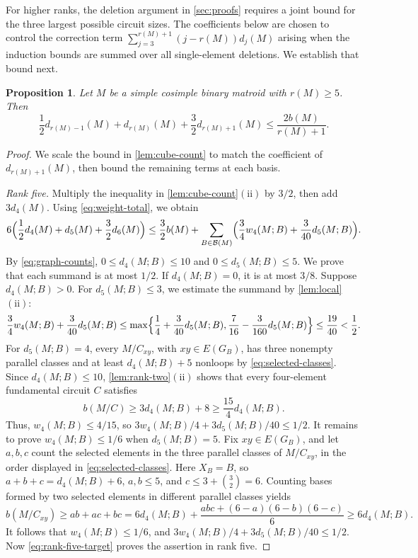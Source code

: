\documentclass[10pt,a4paper]{article}
\numberwithin{equation}{section}
\newtheorem{proposition}[proposition]{Proposition}
\newcommand{\BB}{\mathcal B}
\newcommand{\wloc}[1]{w_{#1}(M;B)}
\newcommand{\dloc}[1]{d_{#1}(M;B)}
\begin{document}
For higher ranks, the deletion argument in \autoref{sec:proofs}
requires a joint bound for the three largest possible circuit sizes.
The coefficients below are chosen to control the correction term
\(\sum_{j=3}^{r(M)+1}(j-r(M))d_j(M)\) arising when the induction
bounds are summed over all single-element deletions.
We establish that bound next.
\begin{proposition}\label{prop:joint}
Let \(M\) be a simple cosimple binary matroid with \(r(M)\ge5\). Then
\[
 \frac12d_{r(M)-1}(M)+d_{r(M)}(M)+\frac32d_{r(M)+1}(M)
 \le\frac{2b(M)}{r(M)+1}.
\]
\end{proposition}
\begin{proof}
We scale the bound in \autoref{lem:cube-count} to match the coefficient of
\(d_{r(M)+1}(M)\), then bound the remaining terms at each basis.

\emph{Rank five.}
Multiply the inequality in \autoref{lem:cube-count}\(\mathrm{(ii)}\)
by \(3/2\), then add \(3d_4(M)\). Using \eqref{eq:weight-total}, we obtain
\begin{equation}
 6\Bigl(\frac12d_4(M)+d_5(M)+\frac32d_6(M)\Bigr)\le\frac32b(M)+\sum_{B\in\BB(M)}
 \Bigl(\frac34\wloc4+\frac3{40}\dloc5\Bigr).
 \label{eq:rank-five-target}
\end{equation}
By \eqref{eq:graph-counts}, \(0\le\dloc4\le10\) and \(0\le\dloc5\le5\).
We prove that each summand is at most \(1/2\).
If \(\dloc4=0\), it is at most \(3/8\).
Suppose \(\dloc4>0\).
For \(\dloc5\le3\), we estimate the summand by \autoref{lem:local}\(\mathrm{(ii)}\):
\[
 \frac34\wloc4+\frac3{40}\dloc5
 \le\max\Bigl\{\frac14+\frac3{40}\dloc5,
 \frac7{16}-\frac3{160}\dloc5\Bigr\}
 \le\frac{19}{40}<\frac12.
\]
For \(\dloc5=4\), every \(M/C_{xy}\), with \(xy\in E(G_B)\),
has three nonempty parallel classes and at least \(\dloc4+5\) nonloops
by \eqref{eq:selected-classes}.
Since \(\dloc4\le10\),
\autoref{lem:rank-two}\(\mathrm{(ii)}\) shows that
every four-element fundamental circuit \(C\) satisfies
\[
 b(M/C)\ge3\dloc4+8\ge\frac{15}4\dloc4.
\]
Thus, \(\wloc4\le4/15\), so
\(3\wloc4/4+3\dloc5/40\le1/2\). It remains to prove \(\wloc4\le1/6\) when \(\dloc5=5\).
Fix \(xy\in E(G_B)\), and let \(a,b,c\)
count the selected elements in the three parallel classes of
\(M/C_{xy}\), in the order displayed in \eqref{eq:selected-classes}.
Here \(X_B=B\), so \(a+b+c=\dloc4+6\),
\(a,b\le5\), and \(c\le3+\binom32=6\).
Counting bases formed by two selected elements in different
parallel classes yields
\[
 b(M/C_{xy})\ge ab+ac+bc
 =6\dloc4+\frac{abc+(6-a)(6-b)(6-c)}6
 \ge6\dloc4.
\]
It follows that \(\wloc4\le1/6\), and
\(3\wloc4/4+3\dloc5/40\le1/2\).
Now \eqref{eq:rank-five-target} proves the assertion in rank five.


\end{proof}
\end{document}
